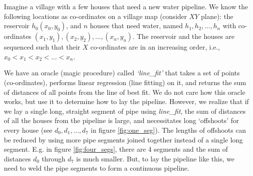 \documentclass[addpoints]{exam}
\def\mysolution#1{}    %
\begin{document}
\begin{questions}


Imagine a village with a few houses that need a new water pipeline. We know the following locations as co-ordinates on a village map (consider $XY$ plane): the reservoir $h_0 (x_0,y_0)$, and $n$ houses that need water, named $h_1, h_2, \dots, h_n$ with co-ordinates $(x_1, y_1), (x_2, y_2), \dots, (x_n, y_n)$. The reservoir and the houses are sequenced such that their $X$ co-ordinates are in an increasing order, i.e., $x_0 < x_1< x_2 < \dots < x_n$.

We have an oracle (magic procedure) called \textit{`line\_fit'} that takes a set of points (co-ordinates), performs linear regression (line fitting) on it, and returns the sum of distances of all points from the line of best fit. We do not care how this oracle works, but use it to determine how to lay the pipeline. However, we realize that if we lay a single long, straight segment of pipe using \textit{line\_fit}, the sum of distances of all the houses from the pipeline is large, and necessitates long `offshoots' for every house (see $d_0, d_1, \dots, d_7$ in figure \ref{fig:one_seg}). The lengths of offshoots can be reduced by using more pipe segments joined together instead of a single long segment. E.g. in figure \ref{fig:four_segs}, there are 4 segments and the sum of distances $d_0$ through $d_7$ is much smaller. But, to lay the pipeline like this, we need to weld the pipe segments to form a continuous pipeline.


\end{questions}
\end{document}
